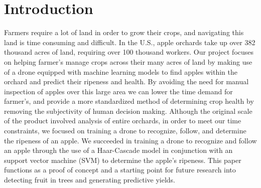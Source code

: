 \section{Introduction}
Farmers require a lot of land in order to grow their crops, and navigating this land is time consuming and difficult.
In the U.S., apple orchards take up over 382 thousand acres of land\cite{USApple}, requiring over 100 thousand workers\cite{USApple}. 
Our project focuses on helping farmer's manage crops across their many acres of land by making use of a drone equipped with machine learning models to 
find apples within the orchard and predict their ripeness and health. By avoiding the need for manual inspection of apples over this large area 
we can lower the time demand for farmer's, and provide a more standardized method of determining crop health by removing the subjectivity of human decision making.
Although the original scale of the product involved analysis of entire orchards, in order to meet our time constraints, we focused on training a drone to recognize, follow, and determine the ripeness of an apple. We succeeded in training a drone to recognize and follow an apple through the use of a Haar-Cascade model in conjunction with an support vector machine (SVM) to determine the apple's ripeness. This paper functions as a proof of concept and a starting point for future research into detecting fruit in trees and generating predictive yields.
\\
